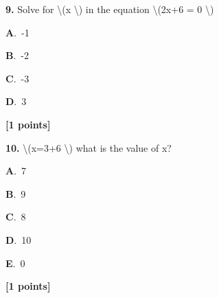 \documentclass[12pt]{article}
\newcommand{\choice}[3]{%
  \noindent\textbf{#1}.~#2\hfill#3\par\vspace{0.25em}
}
\begin{document}
\noindent \textbf{\textenglish{9.}} {\textenglish{Solve for \textbackslash{}(x \textbackslash{}) in the equation \textbackslash{}(2x+6 = 0 \textbackslash{})}}

\noindent\choice{A}{{\textenglish{-1}}}{}
\noindent\choice{B}{{\textenglish{-2}}}{}
\noindent\choice{C}{{\textenglish{-3}}}{}
\noindent\choice{D}{{\textenglish{3}}}{}
\hfill \textbf{[1 points]}\vspace{0.5em}

\noindent \textbf{\textenglish{10.}} {\textenglish{\textbackslash{}(x=3+6 \textbackslash{}) what is the value of x?}}

\noindent\choice{A}{{\textenglish{7}}}{}
\noindent\choice{B}{{\textenglish{9}}}{}
\noindent\choice{C}{{\textenglish{8}}}{}
\noindent\choice{D}{{\textenglish{10}}}{}
\noindent\choice{E}{{\textenglish{0}}}{}
\hfill \textbf{[1 points]}\vspace{0.5em}
\end{document}

